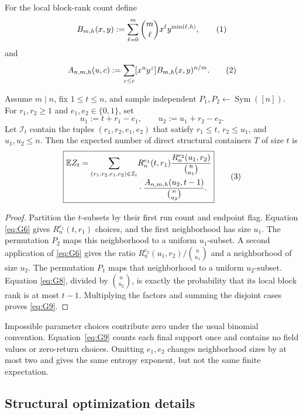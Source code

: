 For the local block-rank count define
\[
    B_{m,h}(x,y)
      :=
    \sum_{\ell=0}^{m}\binom m\ell x^\ell y^{\min(\ell,h)},
    \eqnumlabel{eq:G7}
\]
and
\[
    A_{n,m,h}(u,c)
      :=
    \sum_{z\le c}[x^uy^z]B_{m,h}(x,y)^{n/m}.
    \eqnumlabel{eq:G8}
\]

\begin{theorem}
Assume $m\mid n$, fix $1\le t\le n$, and sample independent
$P_1,P_2\gets\operatorname{Sym}([n])$.  For
$r_1,r_2\ge1$ and $e_1,e_2\in\{0,1\}$, set
\[
    u_1:=t+r_1-e_1,
    \qquad
    u_2:=u_1+r_2-e_2.
\]
Let $\mathcal I_t$ contain the tuples $(r_1,r_2,e_1,e_2)$ that satisfy
$r_1\le t$, $r_2\le u_1$, and $u_1,u_2\le n$.
Then the expected number of direct structural containers $T$ of size $t$ is
\[
\boxed{
\begin{aligned}
\E Z_t
=
\sum_{(r_1,r_2,e_1,e_2)\in\mathcal I_t}
&R_n^{e_1}(t,r_1)
\frac{R_n^{e_2}(u_1,r_2)}{\binom n{u_1}}
\\[-1mm]
&\cdot
\frac{A_{n,m,h}(u_2,t-1)}
     {\binom n{u_2}}.
\end{aligned}
}
\eqnumlabel{eq:G9}
\]
\end{theorem}

\begin{proof}
Partition the $t$-subsets by their first run count and endpoint flag.  Equation
\eqref{eq:G6} gives $R_n^{e_1}(t,r_1)$ choices, and the first neighborhood has size
$u_1$.  The permutation $P_2$ maps this neighborhood to a uniform
$u_1$-subset.  A second application of \eqref{eq:G6} gives the ratio
$R_n^{e_2}(u_1,r_2)/\binom n{u_1}$ and a neighborhood of size $u_2$.  The
permutation $P_1$ maps that neighborhood to a uniform $u_2$-subset.  Equation
\eqref{eq:G8}, divided by $\binom n{u_2}$, is exactly the probability that its local
block rank is at most $t-1$.  Multiplying the factors and summing the disjoint
cases proves \eqref{eq:G9}.
\end{proof}

Impossible parameter choices contribute zero under the usual binomial
convention.  Equation~\eqref{eq:G9} counts each final support once and contains no field
values or zero-return choices.  Omitting $e_1,e_2$ changes neighborhood sizes
by at most two and gives the same entropy exponent, but not the same finite
expectation.




\subsection{Structural optimization details}
\label{app:structural-optimization}

